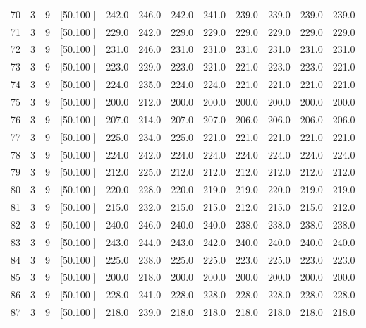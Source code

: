 \documentclass[12pt,a4paper]{article}
\begin{document}
\begin{center}
{\begin{tabular}{r r r r r r r r r r r r}
  70&  3&  9&[50.100    ]&   242.0&   246.0&   242.0&   241.0&   239.0&   239.0&   239.0&   239.0\\[-0.02in]
  71&  3&  9&[50.100    ]&   229.0&   242.0&   229.0&   229.0&   229.0&   229.0&   229.0&   229.0\\[-0.02in]
  72&  3&  9&[50.100    ]&   231.0&   246.0&   231.0&   231.0&   231.0&   231.0&   231.0&   231.0\\[-0.02in]
  73&  3&  9&[50.100    ]&   223.0&   229.0&   223.0&   221.0&   221.0&   223.0&   223.0&   221.0\\[-0.02in]
  74&  3&  9&[50.100    ]&   224.0&   235.0&   224.0&   224.0&   221.0&   221.0&   221.0&   221.0\\[-0.02in]
  75&  3&  9&[50.100    ]&   200.0&   212.0&   200.0&   200.0&   200.0&   200.0&   200.0&   200.0\\[-0.02in]
  76&  3&  9&[50.100    ]&   207.0&   214.0&   207.0&   207.0&   206.0&   206.0&   206.0&   206.0\\[-0.02in]
  77&  3&  9&[50.100    ]&   225.0&   234.0&   225.0&   221.0&   221.0&   221.0&   221.0&   221.0\\[-0.02in]
  78&  3&  9&[50.100    ]&   224.0&   242.0&   224.0&   224.0&   224.0&   224.0&   224.0&   224.0\\[-0.02in]
  79&  3&  9&[50.100    ]&   212.0&   225.0&   212.0&   212.0&   212.0&   212.0&   212.0&   212.0\\[-0.02in]
  80&  3&  9&[50.100    ]&   220.0&   228.0&   220.0&   219.0&   219.0&   220.0&   219.0&   219.0\\[-0.02in]
  81&  3&  9&[50.100    ]&   215.0&   232.0&   215.0&   215.0&   212.0&   215.0&   215.0&   212.0\\[-0.02in]
  82&  3&  9&[50.100    ]&   240.0&   246.0&   240.0&   240.0&   238.0&   238.0&   238.0&   238.0\\[-0.02in]
  83&  3&  9&[50.100    ]&   243.0&   244.0&   243.0&   242.0&   240.0&   240.0&   240.0&   240.0\\[-0.02in]
  84&  3&  9&[50.100    ]&   225.0&   238.0&   225.0&   225.0&   223.0&   225.0&   223.0&   223.0\\[-0.02in]
  85&  3&  9&[50.100    ]&   200.0&   218.0&   200.0&   200.0&   200.0&   200.0&   200.0&   200.0\\[-0.02in]
  86&  3&  9&[50.100    ]&   228.0&   241.0&   228.0&   228.0&   228.0&   228.0&   228.0&   228.0\\[-0.02in]
  87&  3&  9&[50.100    ]&   218.0&   239.0&   218.0&   218.0&   218.0&   218.0&   218.0&   218.0\\[-0.02in]

\end{tabular}}
\end{center}
\end{document}
